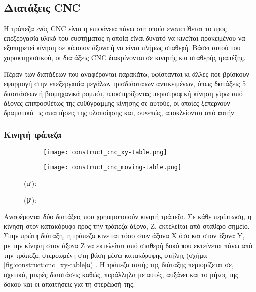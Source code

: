 \subsection{Διατάξεις CNC}

Η τράπεζα ενός CNC είναι η επιφάνεια πάνω στη οποία εναποτίθεται το προς
επεξεργασία υλικό του συστήματος η οποία είναι δυνατό να κινείται προκειμένου να
εξυπηρετεί κίνηση σε κάποιον άξονα ή να είναι πλήρως σταθερή. Βάσει αυτού του
χαρακτηριστικού, οι διατάξεις CNC διακρίνονται σε κινητής και σταθερής τραπέζης.

Πέραν των διατάξεων που αναφέρονται παρακάτω, υφίστανται κι άλλες που βρίσκουν
εφαρμογή στην
επεξεργασία μεγάλων τρισδιάστατων αντικειμένων, όπως διατάξεις 5 διαστάσεων ή
βιομηχανικά ρομπότ, υποστηρίζοντας περιστροφική κίνηση γύρω από άξονες
επιπροσθέτως της ευθύγραμμης κίνησης σε αυτούς, οι οποίες ξεπερνούν δραματικά
τις απαιτήσεις της υλοποίησης και, συνεπώς, αποκλείονται από αυτήν.

\subsubsection{Κινητή τράπεζα}

\begin{figure}
    \caption{Διατάξεις κινητής τραπέζης.
        \label{fig:construct:cnc_moving-table}}
    \begin{center}
        \begin{subfigure}[b]{0.30\textwidth}
            \texttt{[image: construct\_cnc\_xy-table.png]}
            \caption{}
        \end{subfigure}
        \begin{subfigure}[b]{0.45\textwidth}
            \texttt{[image: construct\_cnc\_moving-table.png]}
            \caption{}
        \end{subfigure}
    \end{center}

    (αʹ): 

    (βʹ): 
\end{figure}

Αναφέρονται δύο διατάξεις που χρησιμοποιούν κινητή τράπεζα. Σε κάθε περίπτωση, η
κίνηση στον κατακόρυφο προς την τράπεζα άξονα, Z, εκτελείται από σταθερό σημείο.
Στην πρώτη διάταξη, η τράπεζα κινείται τόσο στον άξονα X όσο και στον άξονα Y,
με την κίνηση στον άξονα Z να εκτελείται από σταθερή δοκό που εκτείνεται πάνω
από την τράπεζα, στερεωμένη στη βάση μέσω κατακόρυφης στήλης (σχήμα
\ref{fig:construct:cnc_xy-table}α) \parencite[69]{albert11}.
Η τράπεζα αυτής της διάταξης περιορίζεται σε, σχετικά, μικρές διαστάσεις καθώς,
παράλληλα με αυτές, αυξάνει και το μήκος της δοκού και οι απαιτήσεις για τη
στερέωσή της.

